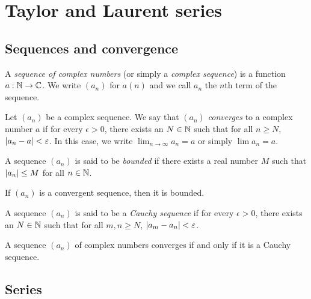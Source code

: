 \chapter{Taylor and Laurent series}

\section{Sequences and convergence}

\begin{definition}
    A \emph{sequence of complex numbers} (or simply a \emph{complex sequence}) is a function \(a: \mathbb{N} \to \mathbb{C}\). We write \((a_n)\) for \(a(n)\) and we call \(a_n\) the \(n\)th term of the sequence.
\end{definition}

\begin{definition}
    Let \((a_n)\) be a complex sequence. We say that \((a_n)\) \emph{converges} to a complex number \(a\) if for every \(\epsilon > 0\), there exists an \(N \in \mathbb{N}\) such that for all \(n \geq N\), \(\left\lvert a_n - a \right\rvert < \varepsilon\). In this case, we write \(\lim_{n \to \infty} a_n = a\) or simply \(\lim a_n = a\).
\end{definition}

\begin{definition}
    A sequence \((a_n)\) is said to be \emph{bounded} if there exists a real number \(M\) such that \(\left\lvert a_n \right\rvert \leq M\) for all \(n \in \mathbb{N}\).
\end{definition}

\begin{theorem}
    If \((a_n)\) is a convergent sequence, then it is bounded.
\end{theorem}

\begin{definition}
    A sequence \((a_n)\) is said to be a \emph{Cauchy sequence} if for every \(\epsilon > 0\), there exists an \(N \in \mathbb{N}\) such that for all \(m, n \geq N\), \(\left\lvert a_m - a_n \right\rvert < \varepsilon\).
\end{definition}

\begin{theorem}
    A sequence \((a_n)\) of complex numbers converges if and only if it is a Cauchy sequence.
\end{theorem}

\section{Series}

